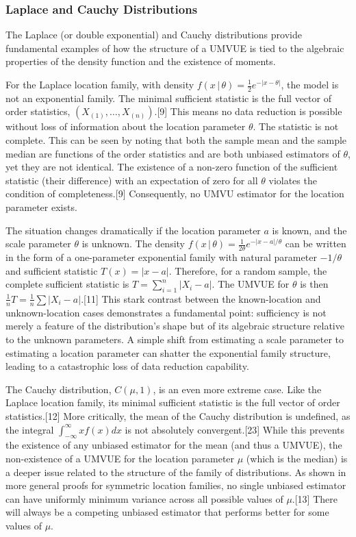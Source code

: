 \documentclass[11pt, letterpaper]{article}
\newcommand{\given}{\,|\,}
\begin{document}
\subsubsection*{Laplace and Cauchy Distributions}
The Laplace (or double exponential) and Cauchy distributions provide fundamental examples of how the structure of a UMVUE is tied to the algebraic properties of the density function and the existence of moments.

For the Laplace location family, with density $f(x \given \theta) = \frac{1}{2} e^{-|x-\theta|}$, the model is not an exponential family. The minimal sufficient statistic is the full vector of order statistics, $(X_{(1)}, \dots, X_{(n)})$.[9] This means no data reduction is possible without loss of information about the location parameter $\theta$. The statistic is not complete. This can be seen by noting that both the sample mean and the sample median are functions of the order statistics and are both unbiased estimators of $\theta$, yet they are not identical. The existence of a non-zero function of the sufficient statistic (their difference) with an expectation of zero for all $\theta$ violates the condition of completeness.[9] Consequently, no UMVU estimator for the location parameter exists.

The situation changes dramatically if the location parameter $a$ is known, and the scale parameter $\theta$ is unknown. The density $f(x \given \theta) = \frac{1}{2\theta} e^{-|x-a|/\theta}$ can be written in the form of a one-parameter exponential family with natural parameter $-1/\theta$ and sufficient statistic $T(x)=|x-a|$. Therefore, for a random sample, the complete sufficient statistic is $T=\sum_{i=1}^n |X_i-a|$. The UMVUE for $\theta$ is then $\frac{1}{n} T = \frac{1}{n} \sum |X_i-a|$.[11] This stark contrast between the known-location and unknown-location cases demonstrates a fundamental point: sufficiency is not merely a feature of the distribution's shape but of its algebraic structure relative to the unknown parameters. A simple shift from estimating a scale parameter to estimating a location parameter can shatter the exponential family structure, leading to a catastrophic loss of data reduction capability.

The Cauchy distribution, $C(\mu,1)$, is an even more extreme case. Like the Laplace location family, its minimal sufficient statistic is the full vector of order statistics.[12] More critically, the mean of the Cauchy distribution is undefined, as the integral $\int_{-\infty}^{\infty} x f(x) dx$ is not absolutely convergent.[23] While this prevents the existence of any unbiased estimator for the mean (and thus a UMVUE), the non-existence of a UMVUE for the location parameter $\mu$ (which is the median) is a deeper issue related to the structure of the family of distributions. As shown in more general proofs for symmetric location families, no single unbiased estimator can have uniformly minimum variance across all possible values of $\mu$.[13] There will always be a competing unbiased estimator that performs better for some values of $\mu$.
\end{document}
